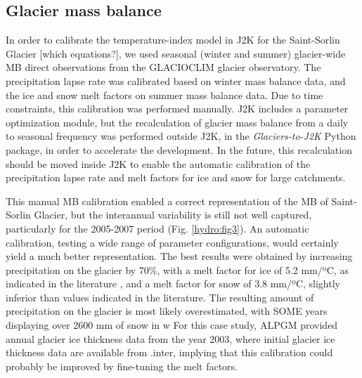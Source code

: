 \subsection{Glacier mass balance}

In order to calibrate the temperature-index model in J2K for the Saint-Sorlin Glacier [which equations?], we used seasonal (winter and summer) glacier-wide MB direct observations from the GLACIOCLIM glacier observatory. The precipitation lapse rate was calibrated based on winter mass balance data, and the ice and snow melt factors on summer mass balance data. Due to time constraints, this calibration was performed manually. J2K includes a parameter optimization module, but the recalculation of glacier mass balance from a daily to seasonal frequency was performed outside J2K, in the \textit{Glaciers-to-J2K} Python package, in order to accelerate the development. In the future, this recalculation should be moved inside J2K to enable the automatic calibration of the precipitation lapse rate and melt factors for ice and snow for large catchments.

This manual MB calibration enabled a correct representation of the MB of Saint-Sorlin Glacier, but the interannual variability is still not well captured, particularly for the 2005-2007 period (Fig. \ref{hydro:fig3}). An automatic calibration, testing a wide range of parameter configurations, would certainly yield a much better representation. The best results were obtained by increasing precipitation on the glacier by 70\%, with a melt factor for ice of 5.2 mm/ºC, as indicated in the literature \citep{reveillet_which_2017}, and a melt factor for snow of 3.8 mm/ºC, slightly inferior than values indicated in the literature. The resulting amount of precipitation on the glacier is most likely overestimated, with SOME years displaying over 2600 mm of snow in w For this case study, ALPGM provided annual glacier ice thickness data from the year 2003, where initial glacier ice thickness data are available from \citet{farinotti_consensus_2019}.inter, implying that this calibration could probably be improved by fine-tuning the melt factors. 

